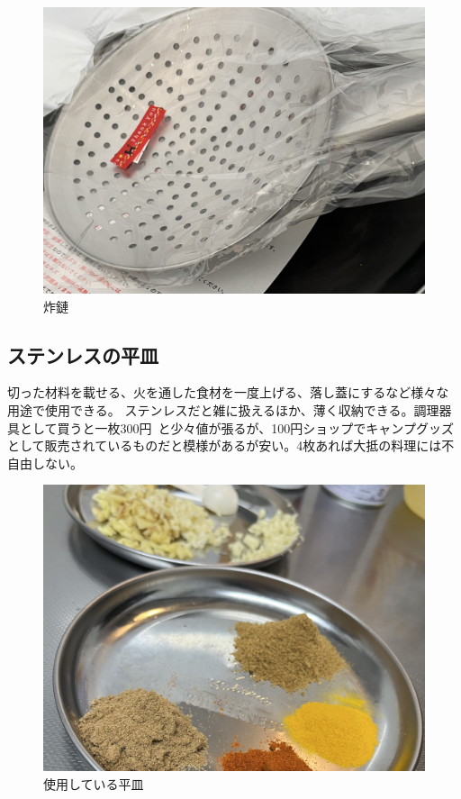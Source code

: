 \documentclass[a4paper,10pt,xelatex,ja=standard,twocolumn]{bxjsarticle}
\begin{document}
\begin{figure}[h]
  \caption{炸鏈}
  \label{jaren}
  \begin{center}
    \includegraphics[width=\linewidth]{IMG_4016.jpg}
  \end{center}
\end{figure}

\subsection{ステンレスの平皿}

切った材料を載せる、火を通した食材を一度上げる、落し蓋にするなど様々な用途で使用できる。
ステンレスだと雑に扱えるほか、薄く収納できる。調理器具として買うと一枚300円~と少々値が張るが、100円ショップでキャンプグッズとして販売されているものだと模様があるが安い。4枚あれば大抵の料理には不自由しない。

\begin{figure}[h]
  \caption{使用している平皿}
  \label{jaren}
  \begin{center}
    \includegraphics[width=\linewidth]{IMG_3985.jpg}
  \end{center}
\end{figure}
\end{document}
